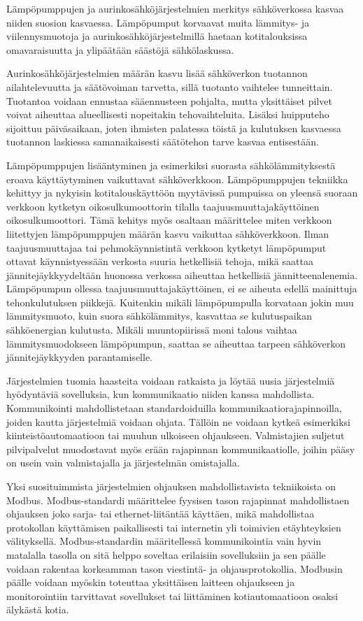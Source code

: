 Lämpöpumppujen ja aurinkosähköjärjestelmien merkitys sähköverkossa kasvaa niiden suosion kasvaessa. Lämpöpumput korvaavat muita lämmitys- ja viilennysmuotoja ja aurinkosähköjärjestelmillä haetaan kotitalouksissa omavaraisuutta ja ylipäätään säästöjä sähkölaskussa.

Aurinkosähköjärjestelmien määrän kasvu lisää sähköverkon tuotannon ailahtelevuutta ja säätövoiman tarvetta, sillä tuotanto vaihtelee tunneittain. Tuotantoa voidaan ennustaa sääennusteen pohjalta, mutta yksittäiset pilvet voivat aiheuttaa alueellisesti nopeitakin tehovaihteluita. Lisäksi huipputeho sijoittuu päiväsaikaan, joten ihmisten palatessa töistä ja kulutuksen kasvaessa tuotannon laskiessa samanaikaisesti säätötehon tarve kasvaa entisestään.

Lämpöpumppujen lisääntyminen ja esimerkiksi suorasta sähkölämmityksestä eroava käyttäytyminen vaikuttavat sähköverkkoon. Lämpöpumppujen tekniikka kehittyy ja nykyisin kotitalouskäyttöön myytävissä pumpuissa on yleensä suoraan verkkoon kytketyn oikosulkumoottorin tilalla taajuusmuuttajakäyttöinen oikosulkumoottori. Tämä kehitys myös osaltaan määrittelee miten verkkoon liitettyjen lämpöpumppujen määrän kasvu vaikuttaa sähköverkkoon. Ilman taajuusmuuttajaa tai pehmokäynnistintä verkkoon kytketyt lämpöpumput ottavat käynnistyessään verkosta suuria hetkellisiä tehoja, mikä saattaa jännitejäykkyydeltään huonossa verkossa aiheuttaa hetkellisiä jännitteenalenemia. Lämpöpumpun ollessa taajuusmuuttajakäyttöinen, ei se aiheuta edellä mainittuja tehonkulutuksen piikkejä. Kuitenkin mikäli lämpöpumpulla korvataan jokin muu lämmitysmuoto, kuin suora sähkölämmitys, kasvattaa se kulutuspaikan sähköenergian kulutusta. Mikäli muuntopiirissä moni talous vaihtaa lämmitysmuodokseen lämpöpumpun, saattaa se aiheuttaa tarpeen sähköverkon jännitejäykkyyden parantamiselle.

Järjestelmien tuomia haasteita voidaan ratkaista ja löytää uusia järjestelmiä hyödyntäviä sovelluksia, kun kommunikaatio niiden kanssa mahdollista. Kommunikointi mahdollistetaan standardoiduilla kommunikaatiorajapinnoilla, joiden kautta järjestelmiä voidaan ohjata. Tällöin ne voidaan kytkeä esimerkiksi kiinteistöautomaatioon tai muuhun ulkoiseen ohjaukseen. Valmistajien suljetut pilvipalvelut muodostavat myös erään rajapinnan kommunikaatiolle, joihin pääsy on usein vain valmistajalla ja järjestelmän omistajalla.

Yksi suosituimmista järjestelmien ohjauksen mahdollistavista tekniikoista on Modbus. Modbus-standardi määrittelee fyysisen tason rajapinnat mahdollistaen ohjauksen joko sarja- tai ethernet-liitäntää käyttäen, mikä mahdollistaa protokollan käyttämisen paikallisesti tai internetin yli toimivien etäyhteyksien välityksellä. Modbus-standardin määritellessä kommunikointia vain hyvin matalalla tasolla on sitä helppo soveltaa erilaisiin sovelluksiin ja sen päälle voidaan rakentaa korkeamman tason viestintä- ja ohjausprotokollia. Modbusin päälle voidaan myöskin toteuttaa yksittäisen laitteen ohjaukseen ja monitorointiin tarvittavat sovellukset tai liittäminen kotiautomaatioon osaksi älykästä kotia.

